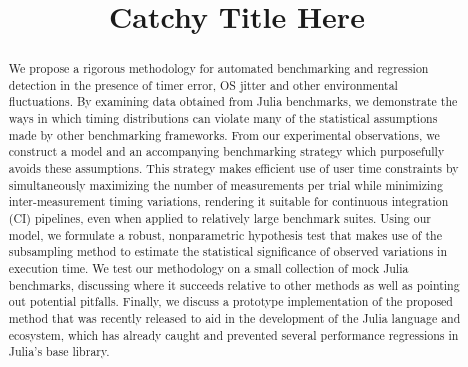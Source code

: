 \documentclass[conference]{IEEEtran}
\begin{document}
\newcommand{\TODO}[1]{\todo[inline]{#1}}
\newcommand{\TODOFIG}[1]{\missingfigure{#1}}

\title{Catchy Title Here}

\author{
}

\maketitle

\begin{abstract}
We propose a rigorous methodology for automated benchmarking and regression detection in the
presence of timer error, OS jitter and other environmental fluctuations. By examining data
obtained from Julia benchmarks, we demonstrate the ways in which timing distributions can
violate many of the statistical assumptions made by other benchmarking frameworks. From our
experimental observations, we construct a model and an accompanying benchmarking
strategy which purposefully avoids these assumptions. This strategy makes efficient use of
user time constraints by simultaneously maximizing the number of measurements per trial
while minimizing inter-measurement timing variations, rendering it suitable for continuous
integration (CI) pipelines, even when applied to relatively large benchmark suites. Using
our model, we formulate a robust, nonparametric hypothesis test that makes use of the
subsampling method to estimate the statistical significance of observed variations
in execution time. We test our methodology on a small collection of mock Julia benchmarks,
discussing where it succeeds relative to other methods as well as pointing out potential
pitfalls. Finally, we discuss a prototype implementation of the proposed method that was
recently released to aid in the development of the Julia language and ecosystem, which has
already caught and prevented several performance regressions in Julia's base library.
\end{abstract}
\end{document}
